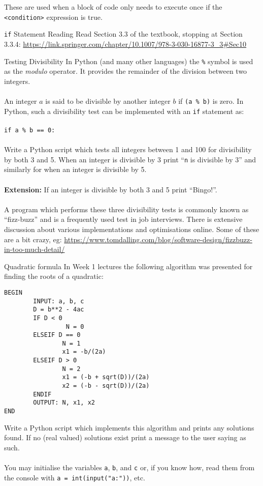 \documentclass{lab}
\begin{document}
These are used when a block of code only needs to execute once if the \texttt{<condition>} expression is true.

\begin{task}{\texttt{if} Statement Reading}{}
Read Section 3.3 of the textbook, stopping at Section 3.3.4: \url{https://link.springer.com/chapter/10.1007/978-3-030-16877-3_3#Sec10} 
\end{task}

\begin{task}{Testing Divisibility}{}
In Python (and many other languages) the \texttt{\%} symbol is used as the \textit{modulo} operator. It provides the remainder of the division between two integers.
\\~\\
An integer $a$ is said to be divisible by another integer $b$ if \texttt{(a \% b)} is zero. In Python, such a divisibility test can be implemented with an \texttt{if} statement as:
\\~\\
\texttt{if a \% b == 0:}
\\~\\
Write a Python script which tests all integers between 1 and 100 for divisibility by both 3 and 5. When an integer is divisible by 3 print ``\texttt{n} is divisible by 3'' and similarly for when an integer is divisible by 5.
\\~\\
\textbf{Extension:} If an integer is divisible by both 3 and 5 print ``Bingo!''.
\\~\\
A program which performs these three divisibility tests is commonly known as ``fizz-buzz'' and is a frequently used test in job interviews. There is extensive discussion about various implementations and optimisations online. Some of these are a bit crazy, eg: \url{https://www.tomdalling.com/blog/software-design/fizzbuzz-in-too-much-detail/}
\end{task}

\pagebreak

\begin{task}{Quadratic formula}{}
In Week 1 lectures the following algorithm was presented for finding the roots of a quadratic:
\begin{lstlisting}[style=pseudo]
BEGIN
        INPUT: a, b, c
        D = b**2 - 4ac
        IF D < 0
                 N = 0
        ELSEIF D == 0
                N = 1
                x1 = -b/(2a)
        ELSEIF D > 0
                N = 2
                x1 = (-b + sqrt(D))/(2a)
                x2 = (-b - sqrt(D))/(2a)
        ENDIF
        OUTPUT: N, x1, x2
END
\end{lstlisting}
Write a Python script which implements this algorithm and prints any solutions found. If no (real valued) solutions exist print a message to the user saying as such.
\\~\\
You may initialise the variables \texttt{a}, \texttt{b}, and \texttt{c} or, if you know how, read them from the console with \texttt{a = int(input("a:"))}, etc.
\end{task}
\end{document}
